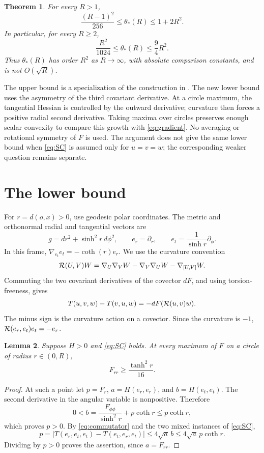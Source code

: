 \documentclass[11pt]{article}
\newtheorem{theorem}{Theorem}[section]
\newtheorem{lemma}[theorem]{Lemma}
\begin{document}
\begin{theorem}\label{thm:main}
For every \(R>1\),
\[
 \frac{(R-1)^2}{256}\leq\theta_*(R)\leq1+2R^2.
\]
In particular, for every \(R\geq2\),
\[
 \frac{R^2}{1024}\leq\theta_*(R)\leq\frac94R^2.
\]
Thus \(\theta_*(R)\) has order \(R^2\) as \(R\to\infty\), with absolute
comparison constants, and is not \(O(\sqrt R)\).
\end{theorem}

The upper bound is a specialization of the construction in
\cite[Theorem~1.6]{HNW}. The new lower bound uses the asymmetry of the
third covariant derivative. At a circle maximum, the tangential Hessian
is controlled by the outward derivative; curvature then forces a
positive radial second derivative. Taking maxima over circles preserves
enough scalar convexity to compare this growth with
\eqref{eq:gradient}. No averaging or rotational symmetry of \(F\) is
used. The argument does not give the same lower bound when
\eqref{eq:SC} is assumed only for \(u=v=w\); the corresponding weaker
question remains separate.

\section{The lower bound}

For \(r=d(o,x)>0\), use geodesic polar coordinates. The metric and
orthonormal radial and tangential vectors are
\[
 g=dr^2+\sinh^2r\,d\phi^2,\qquad
 e_r=\partial_r,\qquad e_t=\frac1{\sinh r}\partial_\phi.
\]
In this frame, \(\nabla_{e_t}e_t=-\coth(r)e_r\). We use the curvature
convention
\[
 {\cal R}(U,V)W=\nabla_U\nabla_VW-\nabla_V\nabla_UW-\nabla_{[U,V]}W.
\]
Commuting the two covariant derivatives of the covector \(dF\), and using
torsion-freeness, gives
\begin{equation}
 T(u,v,w)-T(v,u,w)=-dF({\cal R}(u,v)w).\label{eq:commutator}
\end{equation}
The minus sign is the curvature action on a covector. Since the curvature
is \(-1\), \({\cal R}(e_r,e_t)e_t=-e_r\).

\begin{lemma}\label{lem:circle}
Suppose \(H>0\) and \eqref{eq:SC} holds. At every maximum of \(F\) on a
circle of radius \(r\in(0,R)\),
\[
 F_{rr}\geq\frac{\tanh^2r}{16}.
\]
\end{lemma}

\begin{proof}
At such a point let \(p=F_r\), \(a=H(e_r,e_r)\), and \(b=H(e_t,e_t)\).
The second derivative in the angular variable is nonpositive. Therefore
\begin{equation}
 0<b=\frac{F_{\phi\phi}}{\sinh^2r}+p\coth r\leq p\coth r,
 \label{eq:tangential}
\end{equation}
which proves \(p>0\). By \eqref{eq:commutator} and the two mixed instances
of \eqref{eq:SC},
\[
 p=|T(e_r,e_t,e_t)-T(e_t,e_r,e_t)|
   \leq4\sqrt a\,b
   \leq4\sqrt a\,p\coth r.
\]
Dividing by \(p>0\) proves the assertion, since \(a=F_{rr}\).
\end{proof}
\end{document}
